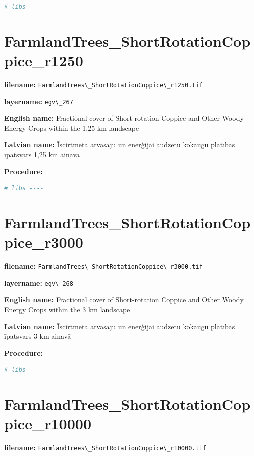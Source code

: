 \documentclass[
]{book}
\newcommand{\passthrough}[1]{#1}
\begin{document}
\begin{lstlisting}[language=R]
# libs ----
\end{lstlisting}

\section{FarmlandTrees\_ShortRotationCoppice\_r1250}\label{ch06.267}

\textbf{filename:} \passthrough{\lstinline!FarmlandTrees\_ShortRotationCoppice\_r1250.tif!}

\textbf{layername:} \passthrough{\lstinline!egv\_267!}

\textbf{English name:} Fractional cover of Short-rotation Coppice and Other Woody Energy Crops within the 1.25 km landscape

\textbf{Latvian name:} Īscirtmeta atvasāju un enerģijai audzētu kokaugu platības īpatsvars 1,25 km ainavā

\textbf{Procedure:}

\begin{lstlisting}[language=R]
# libs ----
\end{lstlisting}

\section{FarmlandTrees\_ShortRotationCoppice\_r3000}\label{ch06.268}

\textbf{filename:} \passthrough{\lstinline!FarmlandTrees\_ShortRotationCoppice\_r3000.tif!}

\textbf{layername:} \passthrough{\lstinline!egv\_268!}

\textbf{English name:} Fractional cover of Short-rotation Coppice and Other Woody Energy Crops within the 3 km landscape

\textbf{Latvian name:} Īscirtmeta atvasāju un enerģijai audzētu kokaugu platības īpatsvars 3 km ainavā

\textbf{Procedure:}

\begin{lstlisting}[language=R]
# libs ----
\end{lstlisting}

\section{FarmlandTrees\_ShortRotationCoppice\_r10000}\label{ch06.269}

\textbf{filename:} \passthrough{\lstinline!FarmlandTrees\_ShortRotationCoppice\_r10000.tif!}
\end{document}
